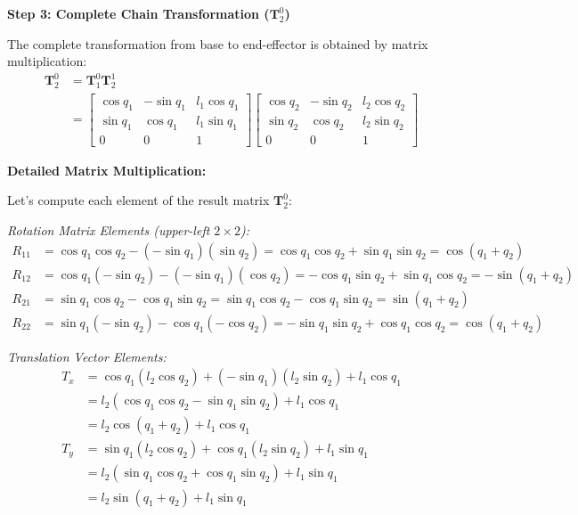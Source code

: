 \documentclass[11pt,a4paper]{article}
\begin{document}
\textbf{Step 3: Complete Chain Transformation ($\bm{T}_2^0$)}

The complete transformation from base to end-effector is obtained by matrix multiplication:
\begin{align}
\bm{T}_2^0 &= \bm{T}_1^0 \bm{T}_2^1 \\
&= \begin{bmatrix}
\cos q_1 & -\sin q_1 & l_1\cos q_1 \\
\sin q_1 & \cos q_1 & l_1\sin q_1 \\
0 & 0 & 1
\end{bmatrix}
\begin{bmatrix}
\cos q_2 & -\sin q_2 & l_2\cos q_2 \\
\sin q_2 & \cos q_2 & l_2\sin q_2 \\
0 & 0 & 1
\end{bmatrix}
\end{align}

\textbf{Detailed Matrix Multiplication:}

Let's compute each element of the result matrix $\bm{T}_2^0$:

\textit{Rotation Matrix Elements (upper-left $2 \times 2$):}
\begin{align}
R_{11} &= \cos q_1 \cos q_2 - (-\sin q_1)(\sin q_2) = \cos q_1 \cos q_2 + \sin q_1 \sin q_2 = \cos(q_1 + q_2) \\
R_{12} &= \cos q_1(-\sin q_2) - (-\sin q_1)(\cos q_2) = -\cos q_1 \sin q_2 + \sin q_1 \cos q_2 = -\sin(q_1 + q_2) \\
R_{21} &= \sin q_1 \cos q_2 - \cos q_1 \sin q_2 = \sin q_1 \cos q_2 - \cos q_1 \sin q_2 = \sin(q_1 + q_2) \\
R_{22} &= \sin q_1(-\sin q_2) - \cos q_1(-\cos q_2) = -\sin q_1 \sin q_2 + \cos q_1 \cos q_2 = \cos(q_1 + q_2)
\end{align}

\textit{Translation Vector Elements:}
\begin{align}
T_x &= \cos q_1 (l_2\cos q_2) + (-\sin q_1)(l_2\sin q_2) + l_1\cos q_1 \\
&= l_2(\cos q_1 \cos q_2 - \sin q_1 \sin q_2) + l_1\cos q_1 \\
&= l_2\cos(q_1 + q_2) + l_1\cos q_1 \\
T_y &= \sin q_1 (l_2\cos q_2) + \cos q_1 (l_2\sin q_2) + l_1\sin q_1 \\
&= l_2(\sin q_1 \cos q_2 + \cos q_1 \sin q_2) + l_1\sin q_1 \\
&= l_2\sin(q_1 + q_2) + l_1\sin q_1
\end{align}
\end{document}
